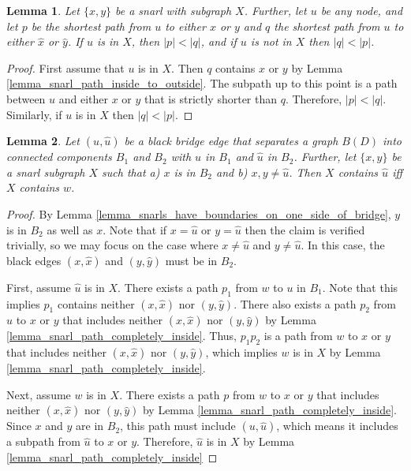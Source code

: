 \documentclass[11pt]{ucthesis}
\newtheorem{lemma}{Lemma}
\newtheorem*{proof}{Proof}
\begin{document}
\begin{lemma}
	Let $\{x,y\}$ be a snarl with subgraph $X$. Further, let $u$ be any node, and let $p$ be the shortest path from $u$ to either $x$ or $y$ and $q$ the shortest path from $u$ to either $\hat x$ or $\hat y$. If $u$ is in $X$, then $|p| < |q|$, and if $u$ is not in $X$ then $|q| < |p|$.
	\label{lemma_shortest_path_determines_subgraph_membership}
\end{lemma}
\begin{proof}
	First assume that $u$ is in $X$. Then $q$ contains $x$ or $y$ by Lemma \ref{lemma_snarl_path_inside_to_outside}. The subpath up to this point is a path between $u$ and either $x$ or $y$ that is strictly shorter than $q$. Therefore, $|p| < |q|$. Similarly, if $u$ is in $X$ then $|q| < |p|$.
\end{proof}

\begin{lemma}
	Let $(u, \hat u)$ be a black bridge edge that separates a graph $B(D)$ into connected components $B_1$ and $B_2$ with $u$ in $B_1$ and $\hat u$ in  $B_2$. Further, let $\{x, y\}$ be a snarl subgraph $X$ such that a) $x$ is in $B_2$ and b) $x, y \neq \hat u$. Then $X$ contains $\hat u$ iff $X$ contains $w$.
	\label{lemma_snarls_across_bridges_are_redundant}
\end{lemma}
\begin{proof}
	 By Lemma \ref{lemma_snarls_have_boundaries_on_one_side_of_bridge}, $y$ is in $B_2$ as well as $x$. Note that if $x = \hat u$ or $y = \hat u$ then the claim is verified trivially, so we may focus on the case where $x \neq \hat u$ and $y \neq \hat u$. In this case, the black edges $(x, \hat x)$ and $(y, \hat y)$ must be in $B_2$.
 	
 	First, assume $\hat u$ is in $X$. There exists a path $p_1$ from $w$ to $u$ in $B_1$. Note that this implies $p_1$ contains neither $(x, \hat x)$ nor $(y, \hat y)$. There also exists a path $p_2$ from $\hat u$ to $x$ or $y$ that includes neither $(x, \hat x)$ nor $(y, \hat y)$ by Lemma \ref{lemma_snarl_path_completely_inside}. Thus, $p_1p_2$ is a path from $w$ to $x$ or $y$ that includes neither $(x, \hat x)$ nor $(y, \hat y)$, which implies $w$ is in $X$ by Lemma \ref{lemma_snarl_path_completely_inside}.
 	 
 	Next, assume $w$ is in $X$. There exists a path $p$ from $w$ to $x$ or $y$ that includes neither $(x, \hat x)$ nor $(y, \hat y)$ by Lemma \ref{lemma_snarl_path_completely_inside}. Since $x$ and $y$ are in $B_2$, this path must include $(u, \hat u)$, which means it includes a subpath from $\hat u$ to $x$ or $y$. Therefore, $\hat u$ is in $X$ by Lemma \ref{lemma_snarl_path_completely_inside}
\end{proof}
\end{document}
